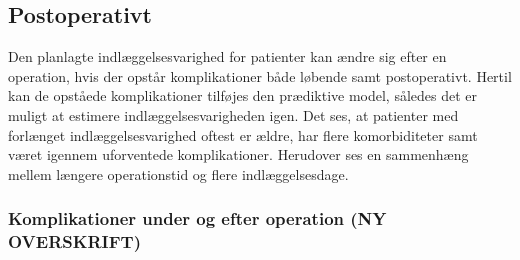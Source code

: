 \subsection{Postoperativt}
Den planlagte indlæggelsesvarighed for patienter kan ændre sig efter en operation, hvis der opstår komplikationer både løbende samt postoperativt. Hertil kan de opståede komplikationer tilføjes den prædiktive model, således det er muligt at estimere indlæggelsesvarigheden igen. Det ses, at patienter med forlænget indlæggelsesvarighed oftest er ældre, har flere komorbiditeter samt været igennem uforventede komplikationer.\cite{Krell2014} Herudover ses en sammenhæng mellem længere operationstid og flere indlæggelsesdage.\cite{Kjeldsen2015b}


\subsubsection{Komplikationer under og efter operation (NY OVERSKRIFT)}






